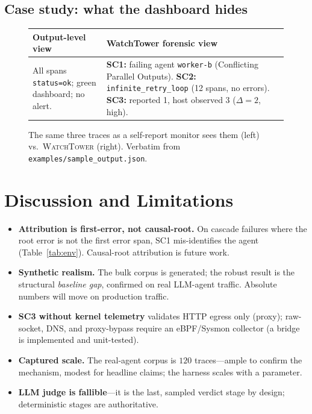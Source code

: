 \documentclass[conference]{IEEEtran}
\begin{document}
\subsection{Case study: what the dashboard hides}
\begin{figure}[t]
\centering\footnotesize
\begin{tabular}{p{}p{}}
\toprule
\textbf{Output-level view} & \textbf{WatchTower forensic view} \\
\midrule
All spans \texttt{status=ok}; green dashboard; no alert. &
\textbf{SC1:} failing agent \texttt{worker-b} (Conflicting Parallel Outputs).
\textbf{SC2:} \texttt{infinite\_retry\_loop} (12 spans, no errors).
\textbf{SC3:} reported 1, host observed 3 ($\Delta{=}2$, high). \\
\bottomrule
\end{tabular}
\caption{The same three traces as a self-report monitor sees them (left) vs.\
\textsc{WatchTower} (right). Verbatim from \texttt{examples/sample\_output.json}.}
\label{fig:casestudy}
\end{figure}

\section{Discussion and Limitations}
\begin{itemize}
\item \textbf{Attribution is first-error, not causal-root.} On cascade failures where the root
error is not the first error span, SC1 mis-identifies the agent (Table~\ref{tab:env}).
Causal-root attribution is future work.
\item \textbf{Synthetic realism.} The bulk corpus is generated; the robust result is the
structural \emph{baseline gap}, confirmed on real LLM-agent traffic. Absolute numbers will move
on production traffic.
\item \textbf{SC3 without kernel telemetry} validates HTTP egress only (proxy); raw-socket, DNS,
and proxy-bypass require an eBPF/Sysmon collector (a bridge is implemented and unit-tested).
\item \textbf{Captured scale.} The real-agent corpus is $120$ traces---ample to confirm the
mechanism, modest for headline claims; the harness scales with a parameter.
\item \textbf{LLM judge is fallible}---it is the last, sampled verdict stage by design;
deterministic stages are authoritative.
\end{itemize}
\end{document}
